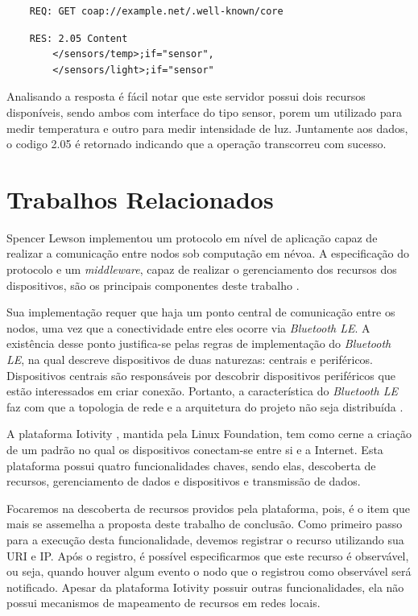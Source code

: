 \begin{verbatim}
    REQ: GET coap://example.net/.well-known/core
\end{verbatim}

\begin{verbatim}
    RES: 2.05 Content
        </sensors/temp>;if="sensor",
        </sensors/light>;if="sensor"
\end{verbatim}


Analisando a resposta é fácil notar que este servidor possui dois recursos disponíveis,
sendo ambos com interface do tipo sensor, porem um utilizado para medir temperatura e outro para medir intensidade de luz.
Juntamente aos dados, o codigo 2.05 é retornado indicando que a operação transcorreu com sucesso.


\section{Trabalhos Relacionados}


Spencer Lewson implementou um protocolo em nível de aplicação \cite{tanenbaum2011redes} capaz de realizar a comunicação entre nodos sob computação em névoa.
A especificação do protocolo e um \textit{middleware}, capaz de realizar o gerenciamento dos recursos dos dispositivos, são os principais componentes deste trabalho \cite{Spencer:2015}.

Sua implementação requer que haja um ponto central de comunicação entre os nodos, uma vez que a conectividade entre eles ocorre via \textit{Bluetooth LE}.
A existência desse ponto justifica-se pelas regras de implementação do \textit{Bluetooth LE}, na qual descreve dispositivos de duas naturezas: centrais e periféricos.
Dispositivos centrais são responsáveis por descobrir dispositivos periféricos que estão interessados em criar conexão.
Portanto, a característica do \textit{Bluetooth LE} faz com que a topologia de rede e a arquitetura do projeto não seja distribuída \cite{Spencer:2015}.

A plataforma Iotivity \cite{iotivity}, mantida pela Linux Foundation, tem como cerne a criação de um padrão no qual os dispositivos conectam-se entre si e a Internet.
Esta plataforma possui quatro funcionalidades chaves, sendo elas, descoberta de recursos, gerenciamento de dados e dispositivos e transmissão de dados.


Focaremos na descoberta de recursos providos pela plataforma, pois, é o item que mais se assemelha a proposta deste trabalho de conclusão.
Como primeiro passo para a execução desta funcionalidade, devemos registrar o recurso utilizando sua URI e IP.
Após o registro, é possível especificarmos que este recurso é observável, ou seja, quando houver algum evento o nodo que o registrou como observável será notificado.
Apesar da plataforma Iotivity possuir outras funcionalidades, ela não possui mecanismos de mapeamento de recursos em redes locais.


